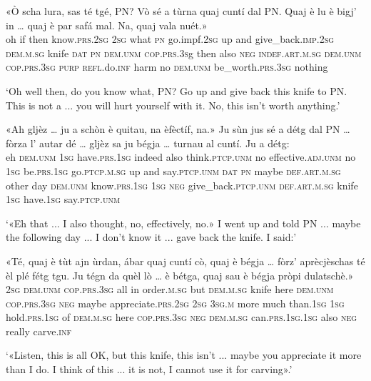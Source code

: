 \begin{linenumbers}
	\gll  «Ò scha lura, sas té tgé, PN? Vò sé a tùrna quaj cuntí dal PN. Quaj è lu è bigj’ in … quaj è par safá mal. Na, quaj vala nuét.»  \\
	oh if then know.\textsc{prs.2sg} \textsc{2sg} what \textsc{pn} go.impf.\textsc{2sg} up and give\_back.\textsc{imp.2sg} \textsc{dem.m.sg} knife \textsc{dat} \textsc{pn} \textsc{dem.unm} \textsc{cop.prs.3s}g then also \textsc{neg} \textsc{indef.art.m.sg} {} \textsc{dem.unm} \textsc{cop.prs.3sg} \textsc{purp}  \textsc{refl}.do.\textsc{inf} harm no \textsc{dem.unm} be\_worth.\textsc{prs.3sg} nothing\\
\end{linenumbers}
\medskip
\glt `Oh well then, do you know what, PN? Go up and give back this knife to PN. This is not a ... you will hurt yourself with it. No, this isn't worth anything.'
\medskip

\begin{linenumbers}
	\gll «Ah gljèz … ju a schòn è quitau, na èfèctíf, na.» Ju sùn jus sé a détg dal PN … fòrza l’ autar dé … gljèz sa ju bégja … turnau al cuntí. Ju a détg:   \\
	eh \textsc{dem.unm} {} \textsc{1sg} have.\textsc{prs.1sg} indeed also think.\textsc{ptcp.unm} no effective.\textsc{adj.unm} no \textsc{1sg} be.\textsc{prs.1sg} go.\textsc{ptcp.m.sg} up and say.\textsc{ptcp.unm} \textsc{dat} \textsc{pn} {} maybe \textsc{def.art.m.sg} other day {} \textsc{dem.unm} know.\textsc{prs.1sg} \textsc{1sg} \textsc{neg} {} give\_back.\textsc{ptcp.unm} \textsc{def.art.m.sg} knife \textsc{1sg} have.\textsc{1sg} say.\textsc{ptcp.unm} \\
\end{linenumbers}
\medskip
\glt `«Eh that ... I also thought, no, effectively, no.» I went up and told PN ... maybe the following day ... I don't know it ... gave back the knife. I said:'
\medskip

\begin{linenumbers}
	\gll «Té, quaj è tùt ajn ùrdan, ábar quaj cuntí cò, quaj è bégja … fòrz’ aprècjèschas té èl plé fétg tgu. Ju tégn da quèl lò … è bétga, quaj sau è bégja pròpi dulatschè.»\\
	\textsc{2sg} \textsc{dem.unm} \textsc{cop.prs.3sg} all in order.\textsc{m.sg} but \textsc{dem.m.sg} knife here \textsc{dem.unm} \textsc{cop.prs.3sg} \textsc{neg} {} maybe appreciate.\textsc{prs.2sg} \textsc{2sg} \textsc{3sg.m} more much than.\textsc{1sg} \textsc{1sg} hold.\textsc{prs.1sg} of \textsc{dem.m.sg} here {} \textsc{cop.prs.3sg} \textsc{neg} \textsc{dem.m.sg} can.\textsc{prs.1sg.1sg} also \textsc{neg} really carve.\textsc{inf}\\
\end{linenumbers}
\medskip
\glt `«Listen, this is all OK, but this knife, this isn't ... maybe you appreciate it more than I do. I think of this ... it is not, I cannot use it for carving».' 
\medskip

